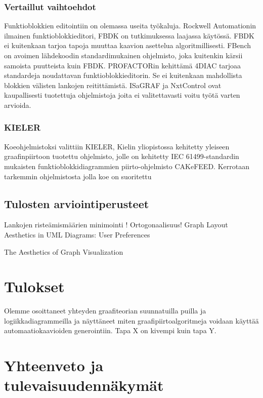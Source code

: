 \documentclass[finnish,12pt]{article}
\begin{document}
			\subsubsection{Vertaillut vaihtoehdot}
	
Funktioblokkien editointiin on olemassa useita työkaluja.
Rockwell Automationin ilmainen funktioblokkieditori, FBDK on tutkimuksessa laajassa käytössä.
FBDK ei kuitenkaan tarjoa tapoja muuttaa kaavion asettelua algoritmillisesti.
FBench on avoimen lähdekoodin standardimukainen ohjelmisto, joka kuitenkin kärsii samoista puutteista kuin FBDK.
PROFACTORin kehittämä 4DIAC tarjoaa standardeja noudattavan funktioblokkieditorin.
Se ei kuitenkaan mahdollista blokkien välisten lankojen reitittämistä.
ISaGRAF ja NxtControl ovat kaupallisesti tuotettuja ohjelmistoja joita ei valitettavasti voitu työtä varten arvioida.

			\subsubsection{KIELER}

Koeohjelmistoksi valittiin KIELER, Kielin yliopistossa kehitetty yleiseen graafinpiirtoon tuotettu ohjelmisto, jolle on kehitetty IEC 61499-standardin mukaisten funktioblokkidiagrammien piirto-ohjelmisto CAKeFEED. 
Kerrotaan tarkemmin ohjelmistosta jolla koe on suoritettu

		\subsection{Tulosten arviointiperusteet}

Lankojen risteämismäärien minimointi !
Ortogonaalisuus!
Graph Layout Aesthetics in UML Diagrams: User Preferences

The Aesthetics of Graph Visualization

	\clearpage
	\section{Tulokset}
	
Olemme osoittaneet yhteyden graafiteorian suunnatuilla puilla ja logiikkadiagrammeilla ja näyttäneet miten graafipiirtoalgoritmeja voidaan käyttää automaatiokaavioiden generointiin.
Tapa X on kivempi kuin tapa Y.

	\section{Yhteenveto ja tulevaisuudennäkymät}
	
\end{document}
